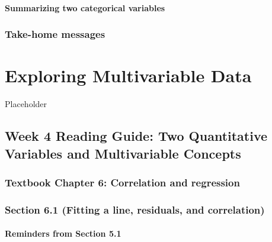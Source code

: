 \documentclass[
]{report}
\begin{document}
\hypertarget{summarizing-two-categorical-variables}{%
\subsubsection*{Summarizing two categorical variables}\label{summarizing-two-categorical-variables}}

\hypertarget{take-home-messages-5}{%
\subsection{Take-home messages}\label{take-home-messages-5}}

\hypertarget{exploring-multivariable-data}{%
\chapter{Exploring Multivariable Data}\label{exploring-multivariable-data}}

Placeholder

\hypertarget{week-4-reading-guide-two-quantitative-variables-and-multivariable-concepts}{%
\section{Week 4 Reading Guide: Two Quantitative Variables and Multivariable Concepts}\label{week-4-reading-guide-two-quantitative-variables-and-multivariable-concepts}}

\hypertarget{textbook-chapter-6-correlation-and-regression}{%
\subsection*{Textbook Chapter 6: Correlation and regression}\label{textbook-chapter-6-correlation-and-regression}}

\hypertarget{section-6.1-fitting-a-line-residuals-and-correlation}{%
\subsection*{Section 6.1 (Fitting a line, residuals, and correlation)}\label{section-6.1-fitting-a-line-residuals-and-correlation}}

\hypertarget{reminders-from-section-5.1}{%
\subsubsection*{Reminders from Section 5.1}\label{reminders-from-section-5.1}}
\end{document}
